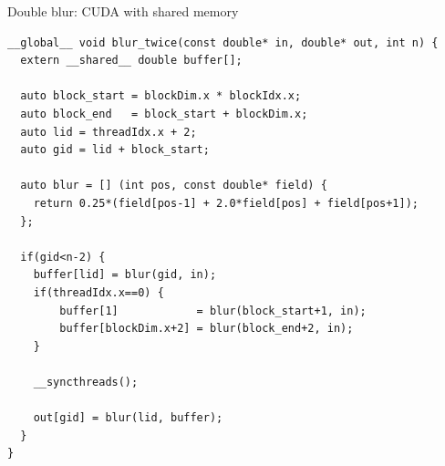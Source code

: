 \documentclass[aspectratio=43]{beamer}
\begin{document}
\begin{frame}[fragile]{}
    \begin{code}{Double blur: CUDA with shared memory}
        \begin{lstlisting}[style=boxcudatiny]
__global__ void blur_twice(const double* in, double* out, int n) {
  extern __shared__ double buffer[];

  auto block_start = blockDim.x * blockIdx.x;
  auto block_end   = block_start + blockDim.x;
  auto lid = threadIdx.x + 2;
  auto gid = lid + block_start;

  auto blur = [] (int pos, const double* field) {
    return 0.25*(field[pos-1] + 2.0*field[pos] + field[pos+1]);
  };

  if(gid<n-2) {
    buffer[lid] = blur(gid, in);
    if(threadIdx.x==0) {
        buffer[1]            = blur(block_start+1, in);
        buffer[blockDim.x+2] = blur(block_end+2, in);
    }

    __syncthreads();

    out[gid] = blur(lid, buffer);
  }
}
        \end{lstlisting}
    \end{code}
\end{frame}
\end{document}
